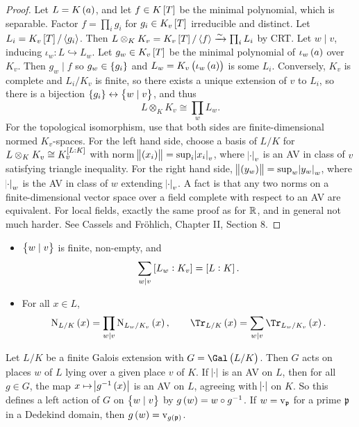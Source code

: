 \begin{proof}
Let $ L = K\br{a} $, and let $ f \in K\sbr{T} $ be the minimal polynomial, which is separable. Factor $ f = \prod_i g_i $ for $ g_i \in K_v\sbr{T} $ irreducible and distinct. Let $ L_i = K_v\sbr{T} / \abr{g_i} $. Then $ L \otimes_K K_v = K_v\sbr{T} / \abr{f} \xrightarrow{\sim} \prod_i L_i $ by CRT. Let $ w \mid v $, inducing $ \iota_w : L \hookrightarrow L_w $. Let $ g_w \in K_v\sbr{T} $ be the minimal polynomial of $ \iota_w\br{a} $ over $ K_v $. Then $ g_w \mid f $ so $ g_w \in \cbr{g_i} $ and $ L_w = K_v\br{\iota_w\br{a}} $ is some $ L_i $. Conversely, $ K_v $ is complete and $ L_i / K_v $ is finite, so there exists a unique extension of $ v $ to $ L_i $, so there is a bijection $ \cbr{g_i} \leftrightarrow \cbr{w \mid v} $, and thus
$$ L \otimes_K K_v \cong \prod_w L_w. $$
For the topological isomorphism, use that both sides are finite-dimensional normed $ K_v $-spaces. For the left hand side, choose a basis of $ L / K $ for $ L \otimes_K K_v \cong K_v^{\sbr{L : K}} $ with norm $ \norm{\br{x_i}} = \sup_i \abs{x_i}_v $, where $ \abs{\cdot}_v $ is an AV in class of $ v $ satisfying triangle inequality. For the right hand side, $ \norm{\br{y_w}} = \sup_w \abs{y_w}_w $, where $ \abs{\cdot}_w $ is the AV in class of $ w $ extending $ \abs{\cdot}_v $. A fact is that any two norms on a finite-dimensional vector space over a field complete with respect to an AV are equivalent. For local fields, exactly the same proof as for $ \mathbb{R} $, and in general not much harder. See Cassels and Fr\"ohlich, Chapter II, Section $ 8 $.
\end{proof}

\begin{corollary}
\label{cor:1.6}
\hfill
\begin{itemize}
\item $ \cbr{w \mid v} $ is finite, non-empty, and
$$ \sum_{w \mid v} \sbr{L_w : K_v} = \sbr{L : K}. $$
\item For all $ x \in L $,
$$ \N_{L / K}\br{x} = \prod_{w \mid v} \N_{L_w / K_v}\br{x}, \qquad \Tr_{L / K}\br{x} = \sum_{w \mid v} \Tr_{L_w / K_v}\br{x}. $$
\end{itemize}
\end{corollary}


Let $ L / K $ be a finite Galois extension with $ G = \Gal\br{L / K} $. Then $ G $ acts on places $ w $ of $ L $ lying over a given place $ v $ of $ K $. If $ \abs{\cdot} $ is an AV on $ L $, then for all $ g \in G $, the map $ x \mapsto \abs{g^{-1}\br{x}} $ is an AV on $ L $, agreeing with $ \abs{\cdot} $ on $ K $. So this defines a left action of $ G $ on $ \cbr{w \mid v} $ by $ g\br{w} = w \circ g^{-1} $. If $ w = \mathrm{v}_{\mathfrak{p}} $ for a prime $ \mathfrak{p} $ in a Dedekind domain, then $ g\br{w} = \v_{g\br{\ppp}} $.

